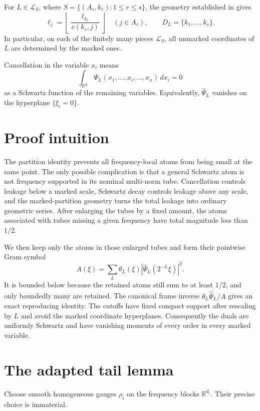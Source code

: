 \documentclass[11pt]{article}
\newcommand{\R}{\mathbb R}
\newcommand{\cL}{\mathcal L}
\newcommand{\dd}{\,d}
\begin{document}
For $L\in\cL_S$, where
$S=\{(A_r,k_r):1\le r\le s\}$, the geometry established in
\cite[Section 3.4]{HNR} gives
\begin{equation}\label{eq:scale-relation}
  \ell_j=\left\lfloor\frac{\ell_{k_r}}{e(k_r,j)}\right\rfloor
  \quad(j\in A_r),
  \qquad D_L=\{k_1,\ldots,k_s\}.
\end{equation}
In particular, on each of the finitely many pieces $\cL_S$, all unmarked
coordinates of $L$ are determined by the marked ones.

Cancellation in the variable $x_i$ means
\[
  \int_{\R^{d_i}}\Psi_L(x_1,\ldots,x_i,\ldots,x_n)\dd x_i=0
\]
as a Schwartz function of the remaining variables.  Equivalently,
$\widehat\Psi_L$ vanishes on the hyperplane $\{\xi_i=0\}$.

\section*{Proof intuition}

The partition identity prevents all frequency-local atoms from being small at
the same point.  The only possible complication is that a general Schwartz
atom is not frequency supported in its nominal multi-norm tube.  Cancellation
controls leakage below a marked scale, Schwartz decay controls leakage above
any scale, and the marked-partition geometry turns the total leakage into
ordinary geometric series.  After enlarging the tubes by a fixed amount, the
atoms associated with tubes missing a given frequency have total magnitude
less than $1/2$.

We then keep only the atoms in those enlarged tubes and form their pointwise
Gram symbol
\[
  A(\xi)=\sum_L\theta_L(\xi)
       \left|\widehat\Psi_L(2^{-L}\xi)\right|^2.
\]
It is bounded below because the retained atoms still sum to at least $1/2$,
and only boundedly many are retained.  The canonical frame inverse
$\theta_L\overline{\widehat\Psi_L}/A$ gives an exact reproducing identity.
The cutoffs have fixed compact support after rescaling by $L$ and avoid the
marked coordinate hyperplanes.  Consequently the duals are uniformly
Schwartz and have vanishing moments of every order in every marked variable.

\section*{The adapted tail lemma}

Choose smooth homogeneous gauges $\rho_i$ on the frequency blocks
$\R^{d_i}$.  Their precise choice is immaterial.
\end{document}
